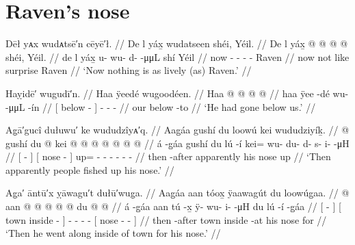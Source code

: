 
\resetexcnt
\chapter{Raven’s nose}\label{ch:301-raven-nose}

\ex\label{ex:301-1-}%
%
\begingl
	\glpreamble	Dēł yᴀx wudᴀtsē′n cēyē′ł. //
	\glpreamble	De l yáx̱ wudatseen shéi, Yéil. //
	\gla	De l yáx̱  @ {} @ {} @ {} @ {} shéi, Yéil. //
	\glb	de l yáx̱ u- wu- d-  -μμL shí Yéil //
	\glc	now   - - -  -  Raven //
	\gld	now not like  {} {} {} {} surprise Raven //
	\glft	‘Now nothing is as lively (as) Raven.’
		//
\endgl
\xe

\ex\label{ex:301-2-}%
%
\begingl
	\glpreamble	Haỵidē′ wugudī′n. //
	\glpreamble	Haa ÿeedé wugoodéen. //
	\gla	{} Haa  @ {} {}  @ {} @ {} @ {} //
	\glb	{} haa ÿee -dé {} wu-  -μμL -ín //
	\glc	{}[  below - {}] -  - - //
	\gld	{} our below -to {}  {} {} {} {} //
	\glft	‘He had gone below us.’
		//
\endgl
\xe

\ex\label{ex:301-3-}%
%
\begingl
	\glpreamble	Ag̣ā′gucî dułuwu′ ke wududzîyᴀ′q. //
	\glpreamble	Aag̱áa gushí du loowú kei wududziyíḵ. //
	\gla	{}  @ {} {} gushí {} du  @ {} {}
		kei @  @ {} @ {} @ {} @ {} @ {} @ {} //
	\glb	{} á -g̱áa {} gushí {} du lú -í {}
		kei= wu- du- d- s- i-  -μH //
	\glc	{}[  - {}]  {}[  nose - {}]
		up= - - - - -  - //
	\gld	{} then -after {} apparently {} his nose {} {}
		up  {} {} {} {} {} {} //
	\glft	‘Then apparently people fished up his nose.’
		//
\endgl
\xe

\ex\label{ex:301-4-}%
%
\begingl
	\glpreamble	Ag̣a′ āntū′x ỵāwagu′t dułū′wug̣a. //
	\glpreamble	Aag̱áa aan tóox̱ ÿaawagút du loowúg̱aa. //
	\gla	{}  @ {} {} {} aan  @ {} {}
		 @ {} @ {} @ {} @ {}
		{} du  @ {} @ {} {} //
	\glb	{} á -g̱áa {} {} aan tú -x̱ {}
		ÿ- wu- i-  -μH
		{} du lú -í -g̱áa {} //
	\glc	{}[  - {}] {}[ town inside - {}]
		- - -  -
		{}[  nose - - {}] //
	\gld	{} then -after {} {} town inside -at {}
		 {} {} {} {} 
		{} his nose {} \·for {} //
	\glft	‘Then he went along inside of town for his nose.’
		//
\endgl
\xe

